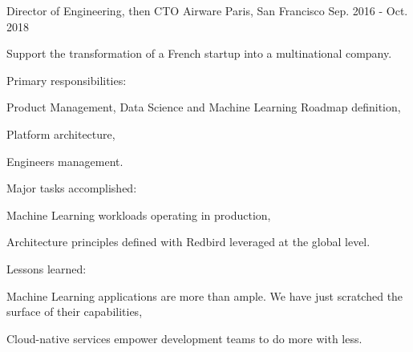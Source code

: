 \begin{cventries}
  \cventry
    {Director of Engineering, then CTO} %
    {Airware} %
    {Paris, San Francisco} %
    {Sep. 2016 - Oct. 2018} %
    {
      \begin{cvitems} %
        \item {Support the transformation of a French startup into a multinational company.}
        \item {Primary responsibilities:}
        \begin{cvsubitems}
          \item {Product Management, Data Science and Machine Learning Roadmap definition,}
          \item {Platform architecture,}
          \item {Engineers management.}
        \end{cvsubitems}
        \item {Major tasks accomplished:}
        \begin{cvsubitems}
          \item {Machine Learning workloads operating in production,}
          \item {Architecture principles defined with Redbird leveraged at the global level.}
        \end{cvsubitems}
        \item {Lessons learned:}
        \begin{cvsubitems}
          \item {Machine Learning applications are more than ample. We have just scratched the surface of their capabilities,}
          \item {Cloud-native services empower development teams to do more with less.}
        \end{cvsubitems}
      \end{cvitems}
    }


\end{cventries}
